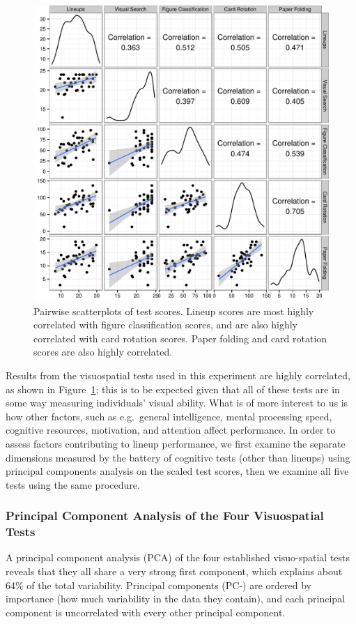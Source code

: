 \documentclass[11pt]{isuthesis}\usepackage[]{graphicx}\usepackage[]{color}
\begin{document}
\begin{figure}[ht]\centering
\includegraphics[width=.5\linewidth]{fig-VisReasoningSPM-1}
\caption[Pairwise scatterplots of test scores]{Pairwise scatterplots of test scores. Lineup scores are most highly correlated with figure classification scores, and are also highly correlated with card rotation scores. Paper folding and card rotation scores are also highly correlated.\label{fig:scatterplotmatrix}}
\end{figure}



Results from the visuospatial tests used in this experiment are highly correlated, as shown in Figure~\ref{fig:scatterplotmatrix}; this is to be expected given that all of these tests are in some way measuring individuals' visual ability. 
What is of more interest to us is how other factors, such as e.g.~general intelligence, mental processing speed, cognitive resources, motivation, and attention affect performance. 
In order to assess factors contributing to lineup performance, we first examine the separate dimensions measured by the battery of cognitive tests (other than lineups) using principal components analysis on the scaled test scores, then we examine all five tests using the same procedure. 


\subsubsection{Principal Component Analysis of the Four Visuospatial Tests}

A principal component analysis (PCA) of the four established visuo-spatial tests reveals that they all share a very strong first component, which explains about 64\% of the total variability. Principal components (PC-) are ordered by importance (how much variability in the data they contain), and each principal component is uncorrelated with every other principal component. 
\end{document}
